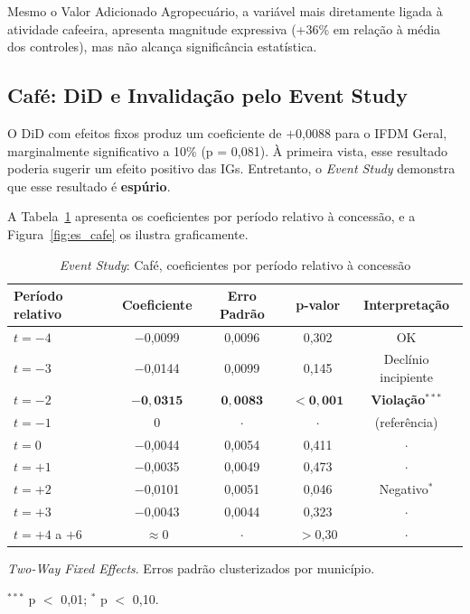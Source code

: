 \documentclass[12pt, a4paper]{article}
\begin{document}
Mesmo o Valor Adicionado Agropecuário, a variável mais diretamente ligada à atividade cafeeira, apresenta magnitude expressiva (+36\% em relação à média dos controles), mas não alcança significância estatística.

\subsection{Café: DiD e Invalidação pelo Event Study}

O DiD com efeitos fixos produz um coeficiente de $+$0,0088 para o IFDM Geral, marginalmente significativo a 10\% (p = 0,081). À primeira vista, esse resultado poderia sugerir um efeito positivo das IGs. Entretanto, o \textit{Event Study} demonstra que esse resultado é \textbf{espúrio}.

A Tabela~\ref{tab:eventstudy_cafe} apresenta os coeficientes por período relativo à concessão, e a Figura~\ref{fig:es_cafe} os ilustra graficamente.

\begin{table}[htbp]
\centering
\caption{\textit{Event Study}: Café, coeficientes por período relativo à concessão}
\label{tab:eventstudy_cafe}
\begin{threeparttable}
\begin{tabular}{lcccc}
\toprule
Período relativo & Coeficiente & Erro Padrão & p-valor & Interpretação \\
\midrule
$t = -4$        & $-$0,0099 & 0,0096 & 0,302   & OK \\
$t = -3$        & $-$0,0144 & 0,0099 & 0,145   & Declínio incipiente \\
$t = -2$        & $\mathbf{-0{,}0315}$ & $\mathbf{0{,}0083}$ & $\mathbf{<0{,}001}$ & \textbf{Violação}$^{***}$ \\
$t = -1$        & 0         & $\cdot$ & $\cdot$ & (referência) \\
$t = 0$         & $-$0,0044 & 0,0054 & 0,411   & $\cdot$ \\
$t = +1$        & $-$0,0035 & 0,0049 & 0,473   & $\cdot$ \\
$t = +2$        & $-$0,0101 & 0,0051 & 0,046   & Negativo$^{*}$ \\
$t = +3$        & $-$0,0043 & 0,0044 & 0,323   & $\cdot$ \\
$t = +4$ a $+6$ & $\approx 0$ & $\cdot$ & $>$0,30 & $\cdot$ \\
\bottomrule
\end{tabular}
\begin{tablenotes}
\small
\item \textit{Two-Way Fixed Effects}. Erros padrão clusterizados por município.
\item $^{***}$ p $<$ 0,01;\; $^{*}$ p $<$ 0,10.
\end{tablenotes}
\end{threeparttable}
\end{table}
\end{document}
